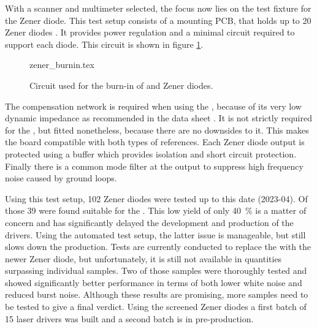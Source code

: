With a scanner and multimeter selected, the focus now lies on the test fixture for the Zener diode. This test setup consists of a mounting PCB, that holds up to 20 Zener diodes \cite{git_lm399_burnin_board}. It provides power regulation and a minimal circuit required to support each diode. This circuit is shown in figure \ref{fig:zener_burnin}.
\begin{figure}[ht]
    \centering
        {zener_burnin.tex}
    \caption{Circuit used for the burn-in of  and  Zener diodes.}
    \label{fig:zener_burnin}
\end{figure}

The compensation network is required when using the , because of its very low dynamic impedance as recommended in the data sheet \cite{datasheet_ADR1399}. It is not strictly required for the , but fitted nonetheless, because there are no downsides to it. This makes the board compatible with both types of references. Each Zener diode output is protected using a buffer which provides isolation and short circuit protection. Finally there is a common mode filter at the output to suppress high frequency noise caused by ground loops.

Using this test setup, \num{102}  Zener diodes were tested up to this date (2023-04). Of those \num{39} were found suitable for the . This low yield of only \qty{40}{\percent} is a matter of concern and has significantly delayed the development and production of the drivers. Using the automated test setup, the latter issue is manageable, but still slows down the production. Tests are currently conducted to replace the  with the newer  Zener diode, but unfortunately, it is still not available in quantities surpassing individual samples. Two of those samples were thoroughly tested and showed significantly better performance in terms of both lower white noise and reduced burst noise. Although these results are promising, more samples need to be tested to give a final verdict. Using the screened Zener diodes a first batch of \num{15} laser drivers was built and a second batch is in pre-production.

